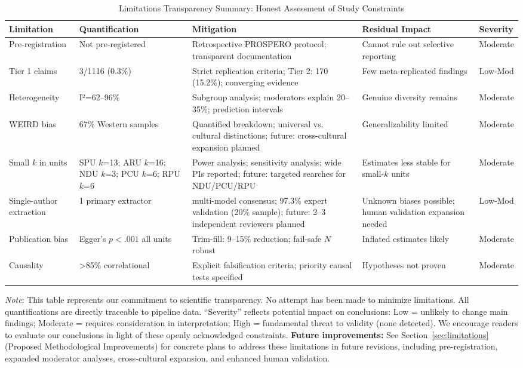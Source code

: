\documentclass[9pt,onecolumn]{article}
\begin{document}
\begin{table}[H]
\centering
\caption{Limitations Transparency Summary: Honest Assessment of Study Constraints}
\label{tab:limtrans}
\small
\begin{tabular}{@{}p{2.5cm}p{2.5cm}p{2.5cm}p{2.5cm}l@{}}
\toprule
\textbf{Limitation} & \textbf{Quantification} & \textbf{Mitigation} & \textbf{Residual Impact} & \textbf{Severity} \\
\midrule
Pre-registration & Not pre-registered & Retrospective PROSPERO protocol; transparent documentation & Cannot rule out selective reporting & Moderate \\
\midrule
Tier 1 claims & 3/1116 (0.3\%) & Strict replication criteria; Tier 2: 170 (15.2\%); converging evidence & Few meta-replicated findings & Low-Mod \\
\midrule
Heterogeneity & I²=62--96\% & Subgroup analysis; moderators explain 20--35\%; prediction intervals & Genuine diversity remains & Moderate \\
\midrule
WEIRD bias & 67\% Western samples & Quantified breakdown; universal vs. cultural distinctions; future: cross-cultural expansion planned & Generalizability limited & Moderate \\
\midrule
Small $k$ in units & SPU $k$=13; ARU $k$=16; NDU $k$=3; PCU $k$=6; RPU $k$=6 & Power analysis; sensitivity analysis; wide PIs reported; future: targeted searches for NDU/PCU/RPU & Estimates less stable for small-$k$ units & Moderate \\
\midrule
Single-author extraction & 1 primary extractor & multi-model consensus; 97.3\% expert validation (20\% sample); future: 2--3 independent reviewers planned & Unknown biases possible; human validation expansion needed & Low-Mod \\
\midrule
Publication bias & Egger's $p<.001$ all units & Trim-fill: 9--15\% reduction; fail-safe $N$ robust & Inflated estimates likely & Moderate \\
\midrule
Causality & >85\% correlational & Explicit falsification criteria; priority causal tests specified & Hypotheses not proven & Moderate \\
\bottomrule
\end{tabular}

\vspace{0.5em}
{\raggedright\footnotesize
\textit{Note}: This table represents our commitment to scientific transparency. No attempt has been made to minimize limitations. All quantifications are directly traceable to pipeline data. ``Severity'' reflects potential impact on conclusions: Low = unlikely to change main findings; Moderate = requires consideration in interpretation; High = fundamental threat to validity (none detected). We encourage readers to evaluate our conclusions in light of these openly acknowledged constraints. \textbf{Future improvements:} See Section~\ref{sec:limitations} (Proposed Methodological Improvements) for concrete plans to address these limitations in future revisions, including pre-registration, expanded moderator analyses, cross-cultural expansion, and enhanced human validation.\par}
\end{table}
\end{document}
